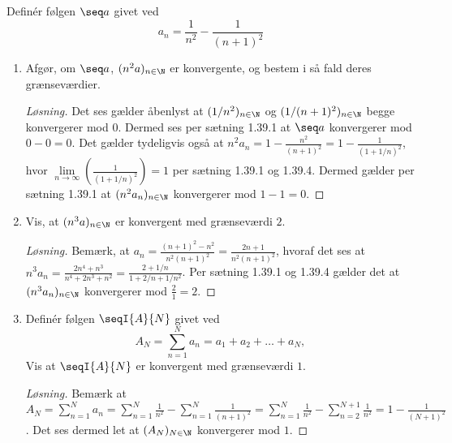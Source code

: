 \begin{opg}
Definér følgen $\seq a$ givet ved
    $$ a_n = \frac{1}{n^2} - \frac{1}{(n+1)^2} $$
\begin{enumerate}
    \item Afgør, om $\seq a$, $(n^2a)_{n\in \N}$ er konvergente, og bestem i så fald deres grænseværdier.
    
    \begin{proof}[Løsning]
    	Det ses gælder åbenlyst at $ (1/n^2)_{n\in\N} $ og $ (1/(n+1)^2)_{n\in\N} $ begge konvergerer mod $ 0 $. Dermed ses per sætning 1.39.1 at $ \seq a $ konvergerer mod $ 0-0=0 $. Det gælder tydeligvis også at $ n^2a_n=1-\frac{n^2}{(n+1)^2}=1-\frac{1}{(1+1/n)^2} $, hvor $ \lim\limits_{n\to\infty}\left(\frac{1}{(1+1/n)^2}\right)=1 $ per sætning 1.39.1 og 1.39.4. Dermed gælder per sætning 1.39.1 at $ (n^2a_n)_{n\in\N} $ konvergerer mod $ 1-1=0 $.
    \end{proof}
    
    
    \item Vis, at $(n^3a)_{n\in\N}$ er konvergent med grænseværdi $2$.
    \begin{proof}[Løsning]
    	Bemærk, at $ a_n=\frac{(n+1)^2-n^2}{n^2(n+1)^2}=\frac{2n+1}{n^2(n+1)^2} $, hvoraf det ses at $ n^3a_n=\frac{2n^4+n^3}{n^4+2n^3+n^2}=\frac{2+1/n}{1+2/n+1/n^2} $. Per sætning 1.39.1 og 1.39.4 gælder det at $ (n^3a_n)_{n\in\N} $ konvergerer mod $ \frac{2}{1}=2 $.
    \end{proof}
    
    \item Definér følgen $\seqI{A}{N}$ givet ved
    $$ A_N = \sum_{n=1}^N a_n = a_1 + a_2 + \ldots + a_N, $$
    Vis at $\seqI{A}{N}$ er konvergent med grænseværdi $1$.
    \begin{proof}[Løsning]
    	Bemærk at $ A_N=\sum_{n=1}^{N}a_n=\sum_{n=1}^{N}\frac{1}{n^2}-\sum_{n=1}^{N}\frac{1}{(n+1)^2}=\sum_{n=1}^{N}\frac{1}{n^2}-\sum_{n=2}^{N+1}\frac{1}{n^2}=1-\frac{1}{(N+1)^2} $. Det ses dermed let at $ (A_N)_{N\in \N} $ konvergerer mod $ 1 $.
    \end{proof}
\end{enumerate}
\end{opg}

